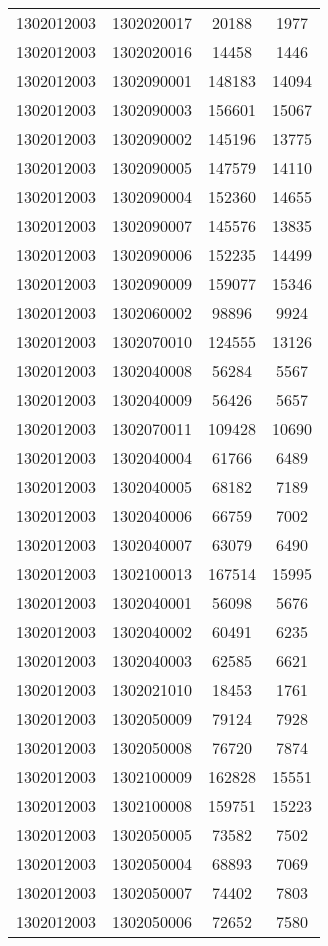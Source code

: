 \begin{longtable}[h]{llcc}
		1302012003 & 1302020017 & 20188 & 1977\\
		1302012003 & 1302020016 & 14458 & 1446\\
		1302012003 & 1302090001 & 148183 & 14094\\
		1302012003 & 1302090003 & 156601 & 15067\\
		1302012003 & 1302090002 & 145196 & 13775\\
		1302012003 & 1302090005 & 147579 & 14110\\
		1302012003 & 1302090004 & 152360 & 14655\\
		1302012003 & 1302090007 & 145576 & 13835\\
		1302012003 & 1302090006 & 152235 & 14499\\
		1302012003 & 1302090009 & 159077 & 15346\\
		1302012003 & 1302060002 & 98896 & 9924\\
		1302012003 & 1302070010 & 124555 & 13126\\
		1302012003 & 1302040008 & 56284 & 5567\\
		1302012003 & 1302040009 & 56426 & 5657\\
		1302012003 & 1302070011 & 109428 & 10690\\
		1302012003 & 1302040004 & 61766 & 6489\\
		1302012003 & 1302040005 & 68182 & 7189\\
		1302012003 & 1302040006 & 66759 & 7002\\
		1302012003 & 1302040007 & 63079 & 6490\\
		1302012003 & 1302100013 & 167514 & 15995\\
		1302012003 & 1302040001 & 56098 & 5676\\
		1302012003 & 1302040002 & 60491 & 6235\\
		1302012003 & 1302040003 & 62585 & 6621\\
		1302012003 & 1302021010 & 18453 & 1761\\
		1302012003 & 1302050009 & 79124 & 7928\\
		1302012003 & 1302050008 & 76720 & 7874\\
		1302012003 & 1302100009 & 162828 & 15551\\
		1302012003 & 1302100008 & 159751 & 15223\\
		1302012003 & 1302050005 & 73582 & 7502\\
		1302012003 & 1302050004 & 68893 & 7069\\
		1302012003 & 1302050007 & 74402 & 7803\\
		1302012003 & 1302050006 & 72652 & 7580\\

\end{longtable}
